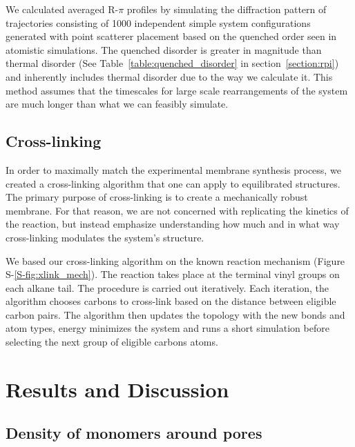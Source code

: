 \documentclass[journal=jpcbfk,manuscript=article]{achemso}
\begin{document}
  We calculated averaged R-$\pi$ profiles by simulating the diffraction pattern
  of trajectories consisting of 1000 independent simple system configurations 
  generated with point scatterer placement based on the quenched order seen in
  atomistic simulations. The quenched disorder is greater in  magnitude than thermal 
  disorder (See Table~\ref{table:quenched_disorder} in section~\ref{section:rpi})
  and inherently includes thermal disorder due to the way we calculate it.
  This method assumes that the timescales for large scale rearrangements of the
  system are much longer than what we can feasibly simulate.

  \subsection{Cross-linking}
  
  In order to maximally match the experimental membrane synthesis process,
  we created a cross-linking algorithm that one can apply to equilibrated structures. 
  The primary purpose of cross-linking is to create a mechanically robust membrane.
  For that reason, we are not concerned with replicating the kinetics of the reaction, 
  but instead emphasize understanding how much and in what way cross-linking modulates
  the system's structure.

  We based our cross-linking algorithm on the known reaction mechanism 
  (Figure S-\ref{S-fig:xlink_mech}). The reaction takes place at the terminal vinyl groups
  on each alkane tail. The procedure is carried out iteratively. Each iteration, the
  algorithm chooses carbons to cross-link based on the distance between eligible 
  carbon pairs. The algorithm then updates the topology with the new bonds and atom
  types, energy minimizes the system and runs a short simulation before selecting 
  the next group of eligible carbons atoms.

  \section{Results and Discussion}
  
  \subsection{Density of monomers around pores}\label{section:mon_per_pore}
\end{document}

